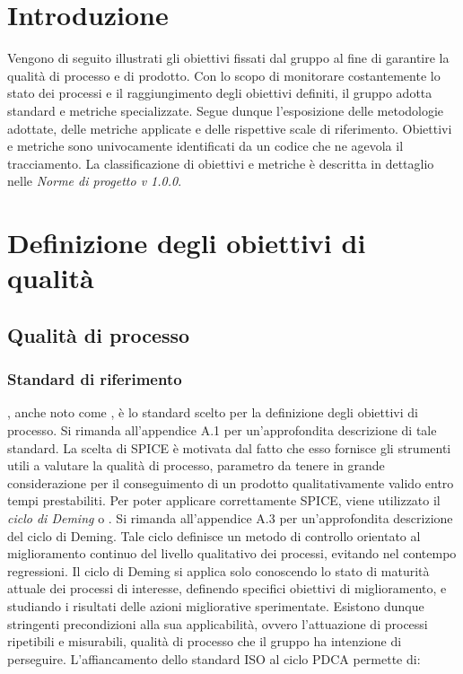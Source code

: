 \documentclass[openany,12pt,a4paper]{report}
\begin{document}
    \section{Introduzione}
    
    Vengono di seguito illustrati gli obiettivi fissati dal gruppo al fine di garantire la qualità di processo e di prodotto. Con lo scopo di monitorare costantemente lo stato dei processi e il raggiungimento degli obiettivi definiti, il gruppo adotta standard e metriche specializzate. Segue dunque l'esposizione delle metodologie adottate, delle metriche applicate e delle rispettive scale di riferimento.
    Obiettivi e metriche sono univocamente identificati da un codice che ne agevola il tracciamento. La classificazione di obiettivi e metriche è descritta in dettaglio nelle \textit{Norme di progetto v 1.0.0}.
    
    \section{Definizione degli obiettivi di qualità}    
    
    \subsection{Qualità di processo}
    
    \subsubsection{Standard di riferimento}
    
    , anche noto come , è lo standard scelto per la definizione degli obiettivi di processo. Si rimanda all'appendice A.1 per un'approfondita descrizione di tale standard.
    La scelta di SPICE è motivata dal fatto che esso fornisce gli strumenti utili a valutare la qualità di processo, parametro da tenere in grande considerazione per il conseguimento di un prodotto qualitativamente valido entro tempi prestabiliti. 
    Per poter applicare correttamente SPICE, viene utilizzato il \textit{ciclo di Deming} o . Si rimanda all'appendice A.3 per un'approfondita descrizione del ciclo di Deming. Tale ciclo definisce un metodo di controllo orientato al miglioramento continuo del livello qualitativo dei processi, evitando nel contempo regressioni. Il ciclo di Deming si applica solo conoscendo lo stato di maturità attuale dei processi di interesse, definendo specifici obiettivi di miglioramento, e studiando i risultati delle azioni migliorative sperimentate. Esistono dunque  stringenti precondizioni alla sua applicabilità, ovvero l'attuazione di processi ripetibili e misurabili, qualità di processo che il gruppo ha intenzione di perseguire. L'affiancamento dello standard ISO al ciclo PDCA permette di:
    
\end{document}
